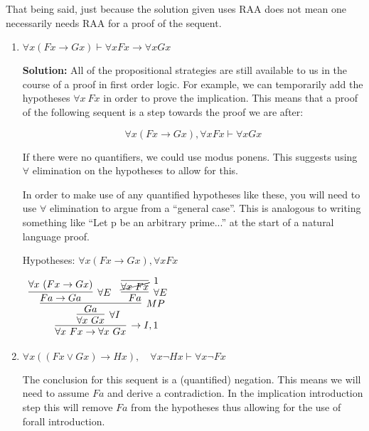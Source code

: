 \documentclass[11pt]{report}
\begin{document}
\begin{enumerate}
		That being said, just because the solution given uses RAA does not mean one necessarily needs RAA for a proof of the sequent.

		\begin{enumerate}
			\item $\forall x (Fx \to Gx) \vdash  \forall x Fx \to \forall x Gx$
			
			{\bf Solution:} All of the propositional strategies are still available to us in the course of a proof in first order logic. For example, we can temporarily add the hypotheses $\forall x \ Fx$ in order to prove the implication. This means that a proof of the following sequent is a step towards the proof we are after: 

			$$\forall x (Fx \to Gx), \forall x Fx \vdash  \forall x Gx$$

			If there were no quantifiers, we could use modus ponens. This suggests using $\forall$ elimination on the hypotheses to allow for this. 

			In order to make use of any quantified hypotheses like these, you will need to use $\forall$ elimination to argue from a ``general case''. This is analogous to writing something like ``Let p be an arbitrary prime...'' at the start of a natural language proof. 

			Hypotheses: $\forall x (Fx \to Gx), \forall x Fx$

				\begin{mdframed}
					\begin{center}
						$\begin{array}{c}
							\infer[\to I,1]{\forall x \ Fx \to \forall x \ Gx}
								{\infer[\forall I]{\forall x \ Gx}
									{\infer[MP]{Ga}
										{\infer[\forall E]{Fa \to Ga}
											{\forall x \ (Fx \to Gx)}
										&
										\infer[\forall E]{Fa}
											{\infer[1]{\cancel{\forall x \ Fx}}{}}}}}
						\end{array}$
					\end{center}
				\end{mdframed}

			
			\newpage
			\item $\forall x ((Fx \lor Gx) \to Hx),\quad \forall x \neg Hx \vdash  \forall x \neg Fx$
			
			The conclusion for this sequent is a (quantified) negation. This means we will need to assume $Fa$ and derive a contradiction. In the implication introduction step this will remove $Fa$ from the hypotheses thus allowing for the use of forall introduction. 


\end{enumerate}
\end{enumerate}
\end{document}
